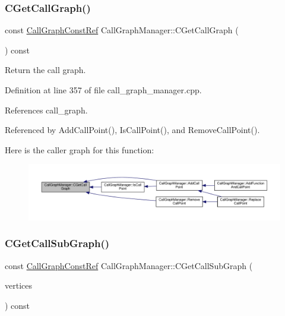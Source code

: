 \subsubsection{\texorpdfstring{C\+Get\+Call\+Graph()}{CGetCallGraph()}}
{\footnotesize\ttfamily const \hyperlink{call__graph_8hpp_a6effd75e39674b4777714051b70eddf2}{Call\+Graph\+Const\+Ref} Call\+Graph\+Manager\+::\+C\+Get\+Call\+Graph (\begin{DoxyParamCaption}{ }\end{DoxyParamCaption}) const}



Return the call graph. 



Definition at line 357 of file call\+\_\+graph\+\_\+manager.\+cpp.



References call\+\_\+graph.



Referenced by Add\+Call\+Point(), Is\+Call\+Point(), and Remove\+Call\+Point().

Here is the caller graph for this function\+:
\nopagebreak
\begin{figure}[H]
\begin{center}
\leavevmode
\includegraphics[width=350pt]{d5/d96/classCallGraphManager_ab9bcffba4526d85c1b3b915905b9356c_icgraph}
\end{center}
\end{figure}
\mbox{\label{classCallGraphManager_a8ebb15b8cc8913f918b549bb9e2ffee1}} 
\subsubsection{\texorpdfstring{C\+Get\+Call\+Sub\+Graph()}{CGetCallSubGraph()}}
{\footnotesize\ttfamily const \hyperlink{call__graph_8hpp_a6effd75e39674b4777714051b70eddf2}{Call\+Graph\+Const\+Ref} Call\+Graph\+Manager\+::\+C\+Get\+Call\+Sub\+Graph (\begin{DoxyParamCaption}\item[{const \hyperlink{classCustomUnorderedSet}{Custom\+Unordered\+Set}$<$ \hyperlink{graph_8hpp_abefdcf0544e601805af44eca032cca14}{vertex} $>$ \&}]{vertices }\end{DoxyParamCaption}) const}



